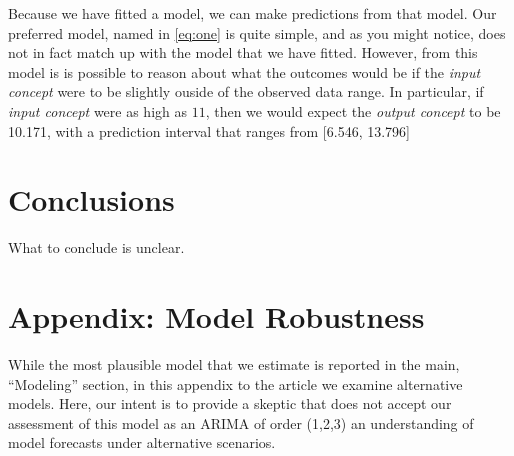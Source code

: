 \documentclass[AER]{AEA}
\begin{document}
Because we have fitted a model, we can make predictions from that model.
Our preferred model, named in \autoref{eq:one} is quite simple, and as
you might notice, does not in fact match up with the model that we have
fitted. However, from this model is is possible to reason about what the
outcomes would be if the \emph{input concept} were to be slightly ouside
of the observed data range. In particular, if \emph{input concept} were
as high as \(11\), then we would expect the \emph{output concept} to be
10.171, with a prediction interval that ranges from {[}6.546, 13.796{]}

\hypertarget{conclusions}{%
\section{Conclusions}\label{conclusions}}

What to conclude is unclear.




\appendix
\section{Appendix: Model Robustness}

While the most plausible model that we estimate is reported in the main,
``Modeling'' section, in this appendix to the article we examine
alternative models. Here, our intent is to provide a skeptic that does
not accept our assessment of this model as an ARIMA of order (1,2,3) an
understanding of model forecasts under alternative scenarios.
\end{document}
